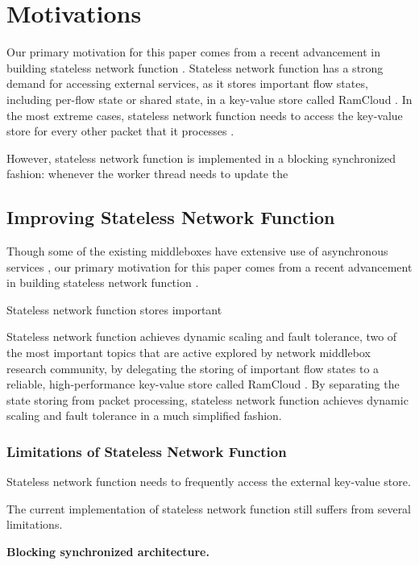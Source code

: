 \section{Motivations}

Our primary motivation for this paper comes from a recent advancement in building stateless network function \cite{}. Stateless network function has a strong demand for accessing external services, as it stores important flow states, including per-flow state or shared state, in a key-value store called RamCloud \cite{}. In the most extreme cases, stateless network function needs to access the key-value store for every other packet that it processes \cite{}.

However, stateless network function is implemented in a blocking synchronized fashion: whenever the worker thread needs to update the 

\subsection{Improving Stateless Network Function}

Though some of the existing middleboxes have extensive use of asynchronous services \cite{}, our primary motivation for this paper comes from a recent advancement in building stateless network function \cite{}.

Stateless network function \cite{} stores important

Stateless network function \cite{} achieves dynamic scaling and fault tolerance, two of the most important topics that are active explored by network middlebox research community, by delegating the storing of important flow states to a reliable, high-performance key-value store called RamCloud \cite{}. By separating the state storing from packet processing, stateless network function achieves dynamic scaling and fault tolerance in a much simplified fashion.

\subsubsection{Limitations of Stateless Network Function}

Stateless network function needs to frequently access the external key-value store.

The current implementation of stateless network function still suffers from several limitations.

\textbf{Blocking synchronized architecture.}

